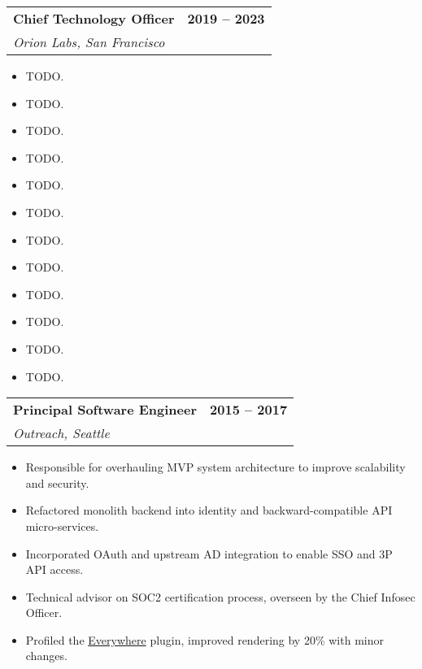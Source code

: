 \documentclass[12pt]{article}
\makeatletter
\newenvironment{justifycolumns}
{\begin{tabular*}{\textwidth}{@{\extracolsep{\fill}}lr@{}}}
{\end{tabular*}}
\newcommand{\row}[2]{#1 & #2 \\}
\newcommand{\rowheading}[2]{\row{\textbf{#1}}{\textbf{#2}}}
\newcommand{\range}[2]{#1 -- #2}
\newcommand{\blockseparation}{\vspace{0.13in}}
\newenvironment{tightbullets}
{\begin{itemize}}
{\end{itemize}}
\newenvironment{bullets}
{\begin{tightbullets}}
{\end{tightbullets} \blockseparation}
\makeatother
\begin{document}
\begin{flushleft}
\begin{justifycolumns}
	\rowheading{Chief Technology Officer}{\range{2019}{2023}}
	\row{\emph{Orion Labs, San Francisco}}{}
\end{justifycolumns}
\begin{bullets}
	\item TODO.
	\item TODO.
	\item TODO.
	\item TODO.
	\item TODO.
	\item TODO.
	\item TODO.
	\item TODO.
	\item TODO.
	\item TODO.
	\item TODO.
	\item TODO.
\end{bullets}
\vspace{0.05in}

\begin{justifycolumns}
	\rowheading{Principal Software Engineer}{\range{2015}{2017}}
	\row{\emph{Outreach, Seattle}}{}
\end{justifycolumns}
\begin{bullets}
	\item Responsible for overhauling MVP system architecture to improve scalability and security.
	\item Refactored monolith backend into identity and backward-compatible API micro-services.
	\item Incorporated OAuth and upstream AD integration to enable SSO and 3P API access.
	\item Technical advisor on SOC2 certification process, overseen by the Chief Infosec Officer.
	\item Profiled the \href{https://chrome.google.com/webstore/detail/outreach-everywhere/chmpifjjfpeodjljjadlobceoiflhdid}{Everywhere} plugin, improved rendering by 20\% with minor changes.
\end{bullets}
\vspace{0.05in}


\end{flushleft}
\end{document}
